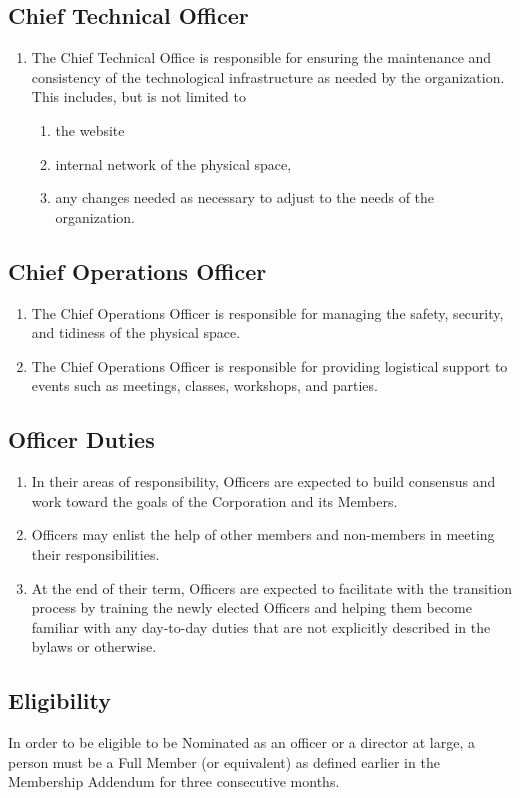 \documentclass{article}
\begin{document}
\subsection{Chief Technical Officer}
\begin{enumerate}
\item The Chief Technical Office is responsible for ensuring the maintenance and 
consistency of the technological infrastructure as needed by the organization.  This 
includes, but is not limited to
\begin{enumerate}
\item the website
\item internal network of the physical space,
\item any changes needed as necessary to adjust to the needs of the organization.
\end{enumerate}
\end{enumerate}
\subsection{Chief Operations Officer}
\begin{enumerate}
\item The Chief Operations Officer is responsible for managing the safety, security, and 
tidiness of the physical space.
\item The Chief Operations Officer is responsible for providing logistical support to events 
such as meetings, classes, workshops, and parties.
\end{enumerate}
\subsection{Officer Duties}
\begin{enumerate}
\item In their areas of responsibility, Officers are expected to build consensus and work 
toward the goals of the Corporation and its Members.
\item Officers may enlist the help of other members and non-members in meeting their 
responsibilities.
\item At the end of their term, Officers are expected to facilitate with the transition 
process by training the newly elected Officers and helping them become familiar with any 
day-to-day duties that are not explicitly described in the bylaws or otherwise.
\end{enumerate}
\subsection{Eligibility}
In order to be eligible to be Nominated as an officer or a director at large, a person must 
be a Full Member (or equivalent) as defined earlier in the Membership Addendum for three 
consecutive months.
\end{document}
